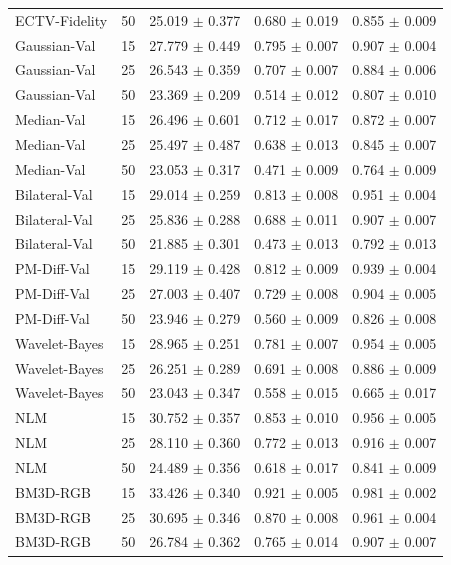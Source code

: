 \begin{tabular}{lcccc}
ECTV-Fidelity & 50 & 25.019 $\pm$ 0.377 & 0.680 $\pm$ 0.019 & 0.855 $\pm$ 0.009 \\
Gaussian-Val & 15 & 27.779 $\pm$ 0.449 & 0.795 $\pm$ 0.007 & 0.907 $\pm$ 0.004 \\
Gaussian-Val & 25 & 26.543 $\pm$ 0.359 & 0.707 $\pm$ 0.007 & 0.884 $\pm$ 0.006 \\
Gaussian-Val & 50 & 23.369 $\pm$ 0.209 & 0.514 $\pm$ 0.012 & 0.807 $\pm$ 0.010 \\
Median-Val & 15 & 26.496 $\pm$ 0.601 & 0.712 $\pm$ 0.017 & 0.872 $\pm$ 0.007 \\
Median-Val & 25 & 25.497 $\pm$ 0.487 & 0.638 $\pm$ 0.013 & 0.845 $\pm$ 0.007 \\
Median-Val & 50 & 23.053 $\pm$ 0.317 & 0.471 $\pm$ 0.009 & 0.764 $\pm$ 0.009 \\
Bilateral-Val & 15 & 29.014 $\pm$ 0.259 & 0.813 $\pm$ 0.008 & 0.951 $\pm$ 0.004 \\
Bilateral-Val & 25 & 25.836 $\pm$ 0.288 & 0.688 $\pm$ 0.011 & 0.907 $\pm$ 0.007 \\
Bilateral-Val & 50 & 21.885 $\pm$ 0.301 & 0.473 $\pm$ 0.013 & 0.792 $\pm$ 0.013 \\
PM-Diff-Val & 15 & 29.119 $\pm$ 0.428 & 0.812 $\pm$ 0.009 & 0.939 $\pm$ 0.004 \\
PM-Diff-Val & 25 & 27.003 $\pm$ 0.407 & 0.729 $\pm$ 0.008 & 0.904 $\pm$ 0.005 \\
PM-Diff-Val & 50 & 23.946 $\pm$ 0.279 & 0.560 $\pm$ 0.009 & 0.826 $\pm$ 0.008 \\
Wavelet-Bayes & 15 & 28.965 $\pm$ 0.251 & 0.781 $\pm$ 0.007 & 0.954 $\pm$ 0.005 \\
Wavelet-Bayes & 25 & 26.251 $\pm$ 0.289 & 0.691 $\pm$ 0.008 & 0.886 $\pm$ 0.009 \\
Wavelet-Bayes & 50 & 23.043 $\pm$ 0.347 & 0.558 $\pm$ 0.015 & 0.665 $\pm$ 0.017 \\
NLM & 15 & 30.752 $\pm$ 0.357 & 0.853 $\pm$ 0.010 & 0.956 $\pm$ 0.005 \\
NLM & 25 & 28.110 $\pm$ 0.360 & 0.772 $\pm$ 0.013 & 0.916 $\pm$ 0.007 \\
NLM & 50 & 24.489 $\pm$ 0.356 & 0.618 $\pm$ 0.017 & 0.841 $\pm$ 0.009 \\
BM3D-RGB & 15 & 33.426 $\pm$ 0.340 & 0.921 $\pm$ 0.005 & 0.981 $\pm$ 0.002 \\
BM3D-RGB & 25 & 30.695 $\pm$ 0.346 & 0.870 $\pm$ 0.008 & 0.961 $\pm$ 0.004 \\
BM3D-RGB & 50 & 26.784 $\pm$ 0.362 & 0.765 $\pm$ 0.014 & 0.907 $\pm$ 0.007 \\

\end{tabular}
